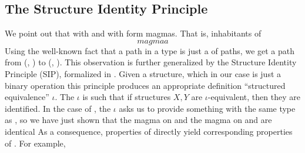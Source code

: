 \subsection{The Structure Identity Principle}
We point out that \bN{} with  and \bL{} with  form magmas. That is, inhabitants of
\[ magmaa \]
Using the well-known fact that a path in a  type is just a  of paths, we get a path from (\bN{}, ) to (\bL{}, ). %
This observation is further generalized by the Structure Identity Principle (SIP), formalized in \cite{iri}. Given a structure, which in our case is just a binary operation
this principle produces an appropriate definition ``structured equivalence'' $\iota$. The $\iota$ is such that if structures $X, Y$ are $\iota$-equivalent, then they are identified. In the case of , the $\iota$ asks us to provide something with the same type as , so we have just shown that the  magma on \bL{}
and the \AgdaFunction{\_+\_} magma on \bN{} and are identical
As a consequence, properties of \AgdaFunction{\_+\_} directly yield corresponding properties of . For example,
